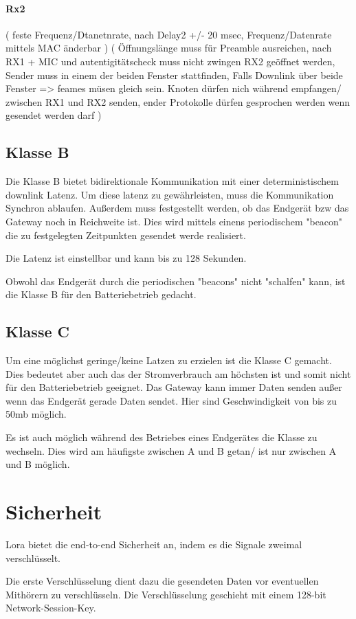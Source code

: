 \documentclass[a4paper,12pt]{article}
\begin{document}
    \paragraph{Rx2}
    \cite{LoRaSpec}(
        feste Frequenz/Dtanetnrate, nach Delay2 +/- 20 msec, Frequenz/Datenrate mittels MAC änderbar
    )
    \cite{LoRaSpec}(
        Öffnungslänge muss für Preamble ausreichen, nach RX1 + MIC und autentigitätscheck muss nicht zwingen RX2 geöffnet werden, Sender muss in einem der beiden Fenster stattfinden, Falls Downlink über beide Fenster => feames müsen gleich sein. Knoten dürfen nich während empfangen/ zwischen RX1 und RX2 senden, ender Protokolle dürfen gesprochen werden wenn gesendet werden darf
    )
    \subsection{Klasse B}
    Die Klasse B bietet bidirektionale Kommunikation mit einer deterministischem downlink Latenz. Um diese latenz zu gewährleisten, muss die Kommunikation Synchron ablaufen. Außerdem muss festgestellt werden, ob das Endgerät bzw das Gateway noch in Reichweite ist. Dies wird mittels einens periodischem "beacon" die zu festgelegten
    Zeitpunkten gesendet werde realisiert.

    Die Latenz ist einstellbar und kann bis zu 128 Sekunden.

    Obwohl das Endgerät durch die periodischen "beacons" nicht "schalfen" kann, ist die Klasse B für den Batteriebetrieb gedacht.
    \subsection{Klasse C}
    Um eine möglichst geringe/keine Latzen zu erzielen ist die Klasse C gemacht. Dies bedeutet aber auch das der Stromverbrauch am höchsten ist und somit nicht für den Batteriebetrieb geeignet.
    Das Gateway kann immer Daten senden außer wenn das Endgerät gerade Daten sendet. Hier sind Geschwindigkeit von bis zu 50mb möglich.

    Es ist auch möglich während des Betriebes eines Endgerätes die Klasse zu wechseln. Dies wird am häufigste zwischen A und B getan/ ist nur zwischen A und B möglich.
    \section{Sicherheit}
    Lora bietet die end-to-end Sicherheit an, indem es die Signale zweimal verschlüsselt.

    Die erste Verschlüsselung dient dazu die gesendeten Daten vor eventuellen Mithörern zu verschlüsseln. Die Verschlüsselung geschieht mit einem 128-bit Network-Session-Key.
\end{document}
